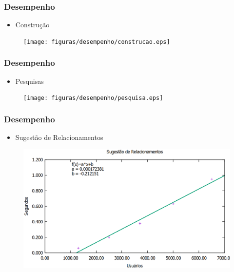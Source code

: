 \documentclass{beamer}
\begin{document}
\begin{frame}
\frametitle{Desempenho}

\begin{itemize}
	\item{Construção}
\end{itemize}

\begin{figure}[h]
	\centering
	\texttt{[image: figuras/desempenho/construcao.eps]}
\end{figure}

\end{frame}

\begin{frame}
\frametitle{Desempenho}

\begin{itemize}
	\item{Pesquisas}
\end{itemize}

\begin{figure}[h]
	\centering
	\texttt{[image: figuras/desempenho/pesquisa.eps]}
\end{figure}

\end{frame}

\begin{frame}
\frametitle{Desempenho}

\begin{itemize}
	\item{Sugestão de Relacionamentos}
\end{itemize}

\begin{figure}[h]
	\centering
	\includegraphics[scale=0.35]{figuras/desempenho/sugestao_relacionamentos.eps}
\end{figure}

\end{frame}
\end{document}
